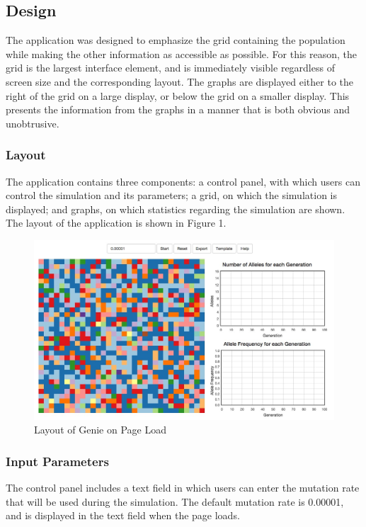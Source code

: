 \documentclass[12pt]{article}
\begin{document}
\begin{spacing}{1.6}
\subsection{Design}
The application was designed to emphasize the grid containing the population while making the other information as accessible as possible. For this reason, the grid is the largest interface element, and is immediately visible regardless of screen size and the corresponding layout. The graphs are displayed either to the right of the grid on a large display, or below the grid on a smaller display. This presents the information from the graphs in a manner that is both obvious and unobtrusive.

\subsubsection{Layout}
The application contains three components: a control panel, with which users can control the simulation and its parameters; a grid, on which the simulation is displayed; and graphs, on which statistics regarding the simulation are shown. The layout of the application is shown in Figure 1.
\begin{figure}[h]
\caption{Layout of Genie on Page Load}
\centering
\includegraphics[scale=0.4]{layout}
\end{figure}

\subsubsection{Input Parameters}
The control panel includes a text field in which users can enter the mutation rate that will be used during the simulation. The default mutation rate is 0.00001, and is displayed in the text field when the page loads.


\end{spacing}
\end{document}
